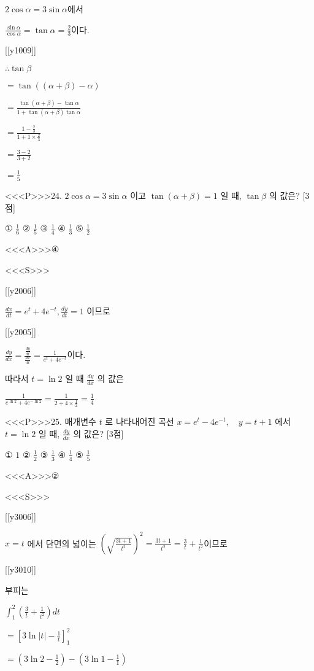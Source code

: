 \documentclass{oblivoir}
\begin{document}
$ 2 \cos \alpha =3 \sin \alpha$에서 

$\frac{\sin \alpha}{\cos \alpha}=\tan \alpha=\frac{2}{3}$이다.

[[y1009]]

$\therefore \tan \beta$

$=\tan ((\alpha+\beta)-\alpha)$

$=\frac{\tan (\alpha+\beta)-\tan \alpha}{1+\tan (\alpha+\beta) \tan \alpha}$

$= \frac{1-\frac{2}{3}}{1+1 \times \frac{2}{3}}$

$=\frac{3-2}{3+2}$

$=\frac{1}{5} $


<<<P>>>24. $2 \cos \alpha=3 \sin \alpha$ 이고 $\tan (\alpha+\beta)=1$ 일 때, $\tan \beta$ 의 값은?
[3점]

① $\frac{1}{6}$
② $\frac{1}{5}$
③ $\frac{1}{4}$
④ $\frac{1}{3}$
⑤ $\frac{1}{2}$


<<<A>>>④

<<<S>>>

[[y2006]]

$ \frac{d x}{d t}=e^{t}+4 e^{-t}, \frac{d y}{d t}=1$ 이므로

[[y2005]]

$\frac{d y}{d x}=\frac{\frac{d y}{d t}}{\frac{d x}{d t}}=\frac{1}{e^{t}+4 e^{-t}}$이다.

따라서 $t=\ln 2$ 일 때 $\frac{d y}{d x}$ 의 값은

$\frac{1}{e^{\ln 2}+4 e^{-\ln 2}}=\frac{1}{2+4 \times \frac{1}{2}}=\frac{1}{4}
$


<<<P>>>25. 매개변수 $t$ 로 나타내어진 곡선
$ x=e^{t}-4 e^{-t}, \quad y=t+1 $
에서 $t=\ln 2$ 일 때, $\frac{d y}{d x}$ 의 값은? [3점]

① $1$
② $\frac{1}{2}$
③ $\frac{1}{3}$
④ $\frac{1}{4}$
⑤ $\frac{1}{5}$



<<<A>>>②

<<<S>>>

[[y3006]]

$x=t$ 에서 단면의 넓이는
$\left(\sqrt{\frac{3 t+1}{t^{2}}}\right)^{2}=\frac{3 t+1}{t^{2}}=\frac{3}{t}+\frac{1}{t^{2}}$이므로

[[y3010]]

부피는

$\int_{1}^{2}\left(\frac{3}{t}+\frac{1}{t^{2}}\right) d t $

$=\left[3 \ln |t|-\frac{1}{t}\right]_{1}^{2}$

$=\left(3 \ln 2-\frac{1}{2}\right)-\left(3 \ln 1-\frac{1}{1}\right)$
\end{document}
